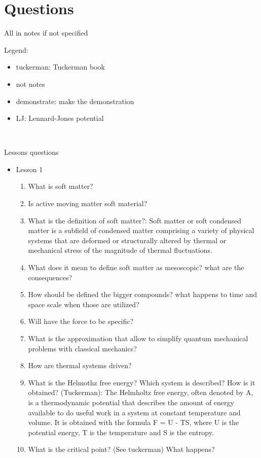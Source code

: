 \chapter{Questions}

All in notes if not specified\\
\small{
Legend:
\begin{itemize}
    \item tuckerman: Tuckerman book
    \item not notes
    \item demonstrate: make the demonstration
    \item LJ: Lennard-Jones potential
\end{itemize}
}
\hfill \\
\small{
Lessons questions
\begin{itemize}
    \item Lesson 1
    \begin{enumerate}
        \item What is soft matter?
        \item Is active moving matter soft material?
        \item What is the definition of soft matter?: Soft matter or soft condensed matter is a subfield of condensed matter comprising a variety of physical systems that are deformed or structurally altered by thermal or mechanical stress of the magnitude of thermal fluctuations.
        \item What does it mean to define soft matter as mesoscopic? what are the consequences?
        \item How should be defined the bigger compounds? what happens to time and space scale when those are utilized?
        \item Will have the force to be specific?
        \item What is the approximation that  allow to simplify quantum mechanical problems with classical mechanics?
        \item How are thermal systems driven?
        \item What is the Helmothz free energy? Which system is described? How is it obtained? (Tuckerman): The Helmholtz free energy, often denoted by A, is a thermodynamic potential that describes the amount of energy available to do useful work in a system at constant temperature and volume. It is obtained with the formula F = U - TS, where U is the potential energy, T is the temperature and S is the entropy.
        \item What is the critical point? (See tuckerman) What happens?

\end{enumerate}
\end{itemize}}
